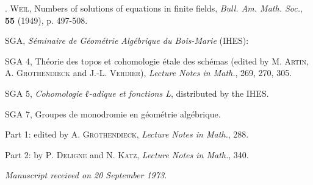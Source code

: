 \documentclass[10pt,leqno]{article}
\begin{document}
\label{physical-36}\par\smallskip

\noindent [\(4] \). \textsc{Weil}, Numbers of solutions of equations in finite fields, \emph{Bull. Am. Math. Soc.}, \textbf{55} (1949), p. 497-508.\par

\noindent SGA, \emph{Séminaire de Géométrie Algébrique du Bois-Marie} (IHES):\par

\noindent SGA 4, Théorie des topos et cohomologie étale des schémas (edited by \(\mathrm{M}\). \textsc{Artin}, \(\mathrm{A}\). \textsc{Grothendieck} and J.-L. \textsc{Verdier}), \emph{Lecture Notes in Math.}, 269, 270, 305.\par

\noindent SGA 5, \emph{Cohomologie ℓ-adique et fonctions L}, distributed by the IHES.\par

\noindent SGA 7, Groupes de monodromie en géométrie algébrique.\par

\noindent Part 1: edited by \(\mathrm{A}\). \textsc{Grothendieck}, \emph{Lecture Notes in Math.}, 288.\par

\noindent Part 2: by \(\mathrm{P}\). \textsc{Deligne} and \(\mathrm{N}\). \textsc{Katz}, \emph{Lecture Notes in Math.}, 340.\par

\begin{flushright}\emph{Manuscript received on 20 September 1973.}\end{flushright}

\clearpage
\end{document}
